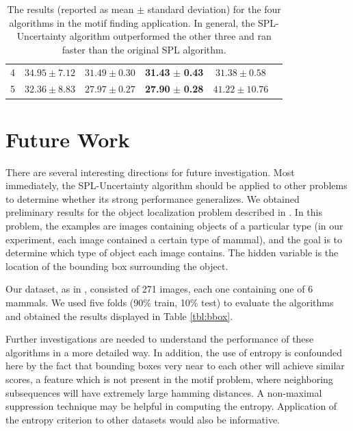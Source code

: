 \documentclass{article}
\newcommand{\mysection}[1]{\vspace{-4mm}\section{#1}\vspace{-4mm}}
\begin{document}
\begin{table}
\begin{center}
{\begin{tabular}{|c|c|c|c|c|c|}
4 & $34.95 \pm 7.12$ & $31.49 \pm 0.30$ & \textbf{31.43} $\pm$ \textbf{0.43} & $31.38 \pm 0.58$\\
5 & $32.36 \pm 8.83$ & $27.97 \pm 0.27$ & \textbf{27.90} $\pm$ \textbf{0.28} & $41.22 \pm 10.76$\\\hline
\end{tabular}
}
\end{center}
\caption{The results (reported as mean $\pm$ standard deviation) for the four algorithms in the motif finding application. In general, the SPL-Uncertainty algorithm outperformed the other three and ran faster than the original SPL algorithm. }
\label{tbl:motif}
\end{table}


\mysection{Future Work}
\label{sec:futureWork}

There are several interesting directions for future investigation. Most immediately, the SPL-Uncertainty algorithm should be applied to other problems to determine whether its strong performance generalizes. We obtained preliminary results for the object localization problem described in \cite{SPL}. In this problem, the examples are images containing objects of a particular type (in our experiment, each image contained a certain type of mammal), and the goal is to determine which type of object each image contains. The hidden variable is the location of the bounding box surrounding the object. 

Our dataset, as in \cite{SPL}, consisted of 271 images, each one containing one of 6 mammals. We used five folds (90\% train, 10\% test) to evaluate the algorithms and obtained the results displayed in Table \ref{tbl:bbox}.  

Further investigations are needed to understand the performance of these algorithms in a more detailed way.  In addition, the use of entropy is confounded here by the fact that bounding boxes very near to each other will achieve similar scores, a feature which is not present in the motif problem, where neighboring subsequences will have extremely large hamming distances.  A non-maximal suppression technique may be helpful in computing the entropy.  Application of the entropy criterion to other datasets would also be informative.
\end{document}
